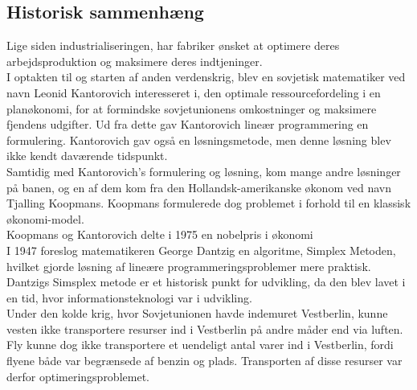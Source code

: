 \subsection{Historisk sammenhæng}
Lige siden industrialiseringen, har fabriker ønsket at optimere deres arbejdsproduktion og maksimere deres indtjeninger. \\ %
I optakten til og starten af anden verdenskrig, blev en sovjetisk matematiker ved navn Leonid Kantorovich interesseret i, den optimale ressourcefordeling i en planøkonomi, for at formindske sovjetunionens omkostninger og maksimere fjendens udgifter. Ud fra dette gav Kantorovich lineær programmering en formulering. Kantorovich gav også en løsningsmetode, men denne løsning blev ikke kendt daværende tidspunkt.\\
Samtidig med Kantorovich's formulering og løsning, kom  mange andre løsninger på banen, og en af dem kom fra den Hollandsk-amerikanske økonom ved navn Tjalling Koopmans. Koopmans formulerede dog problemet i forhold til en klassisk økonomi-model.\\
Koopmans og Kantorovich delte i 1975 en nobelpris i økonomi\\
I 1947 foreslog matematikeren George Dantzig en algoritme, Simplex Metoden, hvilket gjorde løsning af lineære programmeringsproblemer mere praktisk.\\
Dantzigs Simsplex metode er et historisk punkt for udvikling, da den blev lavet i en tid, hvor informationsteknologi var i udvikling.
\\%
Under den kolde krig, hvor Sovjetunionen havde indemuret Vestberlin, kunne vesten ikke transportere resurser ind i Vestberlin på andre måder end via luften.
Fly kunne dog ikke transportere et uendeligt antal varer ind i Vestberlin, fordi flyene både var begrænsede af benzin og plads. 
Transporten af disse resurser var derfor optimeringsproblemet.



